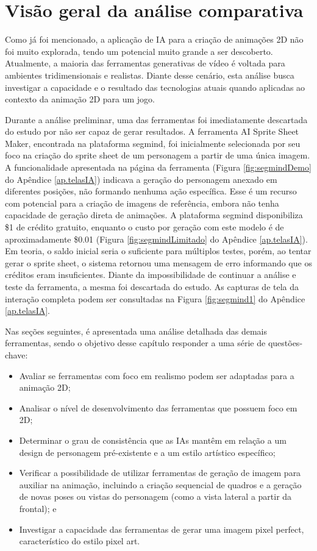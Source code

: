 \FloatBarrier
\section{Visão geral da análise comparativa}
\label{s.visaoAnalise}

Como já foi mencionado, a aplicação de IA para a criação de animações 2D não foi muito explorada, tendo um potencial muito grande a ser descoberto. Atualmente, a maioria das ferramentas generativas de vídeo é voltada para ambientes tridimensionais e realistas. Diante desse cenário, esta análise busca investigar a capacidade e o resultado das tecnologias atuais quando aplicadas ao contexto da animação 2D para um jogo.

Durante a análise preliminar, uma das ferramentas foi imediatamente descartada do estudo por não ser capaz de gerar resultados. A ferramenta AI Sprite Sheet Maker, encontrada na plataforma segmind, foi inicialmente selecionada por seu foco na criação do sprite sheet de um personagem a partir de uma única imagem. A funcionalidade apresentada na página da ferramenta (Figura \ref{fig:segmindDemo} do Apêndice \ref{ap.telasIA}) indicava a geração do personagem anexado em diferentes posições, não formando nenhuma ação específica. Esse é um recurso com potencial para a criação de imagens de referência, embora não tenha capacidade de geração direta de animações. A plataforma segmind disponibiliza \$1 de crédito gratuito, enquanto o custo por geração com este modelo é de aproximadamente \$0.01 (Figura \ref{fig:segmindLimitado} do Apêndice \ref{ap.telasIA}). Em teoria, o saldo inicial seria o suficiente para múltiplos testes, porém, ao tentar gerar o sprite sheet, o sistema retornou uma mensagem de erro informando que os créditos eram insuficientes. Diante da impossibilidade de continuar a análise e teste da ferramenta, a mesma foi descartada do estudo. As capturas de tela da interação completa podem ser consultadas na Figura \ref{fig:segmind1} do Apêndice \ref{ap.telasIA}.  


Nas seções seguintes, é apresentada uma análise detalhada das demais ferramentas, sendo o objetivo desse capítulo responder a uma série de questões-chave:

\begin{itemize}
    \item Avaliar se ferramentas com foco em realismo podem ser adaptadas para a animação 2D; 
    \item Analisar o nível de desenvolvimento das ferramentas que possuem foco em 2D; 
    \item Determinar o grau de consistência que as IAs mantêm em relação a um design de personagem pré-existente e a um estilo artístico específico; 
    \item Verificar a possibilidade de utilizar ferramentas de geração de imagem para auxiliar na animação, incluindo a criação sequencial de quadros e a geração de novas poses ou vistas do personagem (como a vista lateral a partir da frontal); e
    \item Investigar a capacidade das ferramentas de gerar uma imagem pixel perfect, característico do estilo pixel art.
\end{itemize}

